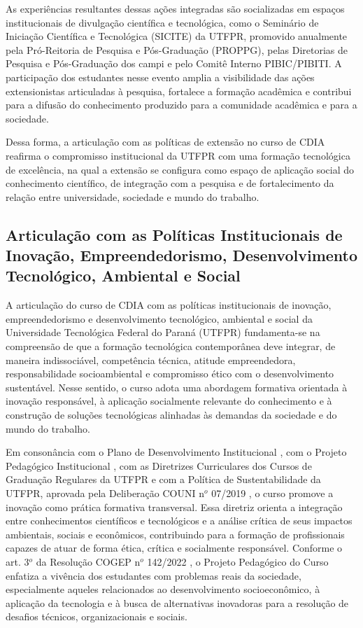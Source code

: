 As experiências resultantes dessas ações integradas são socializadas em espaços institucionais de divulgação científica e tecnológica, como o Seminário de Iniciação Científica e Tecnológica (SICITE) da UTFPR, promovido anualmente pela Pró-Reitoria de Pesquisa e Pós-Graduação (PROPPG), pelas Diretorias de Pesquisa e Pós-Graduação dos campi e pelo Comitê Interno PIBIC/PIBITI. A participação dos estudantes nesse evento amplia a visibilidade das ações extensionistas articuladas à pesquisa, fortalece a formação acadêmica e contribui para a difusão do conhecimento produzido para a comunidade acadêmica e para a sociedade.

Dessa forma, a articulação com as políticas de extensão no curso de CDIA reafirma o compromisso institucional da UTFPR com uma formação tecnológica de excelência, na qual a extensão se configura como espaço de aplicação social do conhecimento científico, de integração com a pesquisa e de fortalecimento da relação entre universidade, sociedade e mundo do trabalho.

\subsection{Articulação com as Políticas Institucionais de Inovação, Empreendedorismo, Desenvolvimento Tecnológico, Ambiental e Social}

A articulação do curso de CDIA com as políticas institucionais de inovação, empreendedorismo e desenvolvimento tecnológico, ambiental e social da Universidade Tecnológica Federal do Paraná (UTFPR) fundamenta-se na compreensão de que a formação tecnológica contemporânea deve integrar, de maneira indissociável, competência técnica, atitude empreendedora, responsabilidade socioambiental e compromisso ético com o desenvolvimento sustentável. Nesse sentido, o curso adota uma abordagem formativa orientada à inovação responsável, à aplicação socialmente relevante do conhecimento e à construção de soluções tecnológicas alinhadas às demandas da sociedade e do mundo do trabalho.

Em consonância com o Plano de Desenvolvimento Institucional \cite{UTFPR_PDI_2023}, com o Projeto Pedagógico Institucional \cite{UTFPR_PPI_2019}, com as Diretrizes Curriculares dos Cursos de Graduação Regulares da UTFPR \cite{UTFPR_DC_2022} e com a Política de Sustentabilidade da UTFPR, aprovada pela Deliberação COUNI n$^o$ 07/2019 \cite{UTFPR_SUST_POL_2019}, o curso promove a inovação como prática formativa transversal. Essa diretriz orienta a integração entre conhecimentos científicos e tecnológicos e a análise crítica de seus impactos ambientais, sociais e econômicos, contribuindo para a formação de profissionais capazes de atuar de forma ética, crítica e socialmente responsável. Conforme o art. 3$^o$ da Resolução COGEP n$^o$ 142/2022 \cite{UTFPR_DC_2022}, o Projeto Pedagógico do Curso enfatiza a vivência dos estudantes com problemas reais da sociedade, especialmente aqueles relacionados ao desenvolvimento socioeconômico, à aplicação da tecnologia e à busca de alternativas inovadoras para a resolução de desafios técnicos, organizacionais e sociais.

